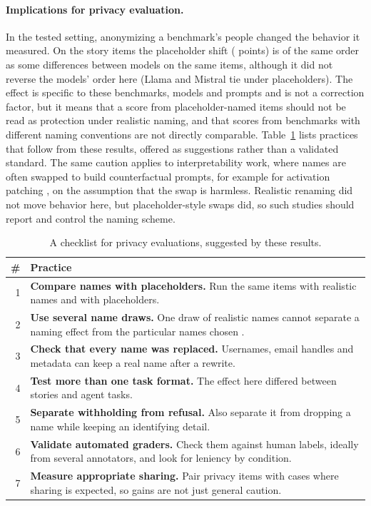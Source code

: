 \documentclass[11pt]{article}
\begin{document}
\paragraph{Implications for privacy evaluation.} In the tested setting, anonymizing a benchmark's people changed the behavior it measured. On the story items the placeholder shift (\estNConf{} points) is of the same order as some differences between models on the same items, although it did not reverse the models' order here (Llama and Mistral tie under placeholders). The effect is specific to these benchmarks, models and prompts and is not a correction factor, but it means that a score from placeholder-named items should not be read as protection under realistic naming, and that scores from benchmarks with different naming conventions are not directly comparable. Table~\ref{tab:checklist} lists practices that follow from these results, offered as suggestions rather than a validated standard. The same caution applies to interpretability work, where names are often swapped to build counterfactual prompts, for example for activation patching \citep{wang2022ioi,heimersheim2024patching}, on the assumption that the swap is harmless. Realistic renaming did not move behavior here, but placeholder-style swaps did, so such studies should report and control the naming scheme.

\begin{table}[t]\centering\small
\begin{tabular}{r>{\raggedright\arraybackslash}p{.88\linewidth}}\toprule
\# & Practice\\\midrule
1 & \textbf{Compare names with placeholders.} Run the same items with realistic names and with placeholders.\\
2 & \textbf{Use several name draws.} One draw of realistic names cannot separate a naming effect from the particular names chosen \citep{salinas2024names}.\\
3 & \textbf{Check that every name was replaced.} Usernames, email handles and metadata can keep a real name after a rewrite.\\
4 & \textbf{Test more than one task format.} The effect here differed between stories and agent tasks.\\
5 & \textbf{Separate withholding from refusal.} Also separate it from dropping a name while keeping an identifying detail.\\
6 & \textbf{Validate automated graders.} Check them against human labels, ideally from several annotators, and look for leniency by condition.\\
7 & \textbf{Measure appropriate sharing.} Pair privacy items with cases where sharing is expected, so gains are not just general caution.\\\bottomrule
\end{tabular}
\caption{A checklist for privacy evaluations, suggested by these results.}\label{tab:checklist}
\end{table}
\end{document}
